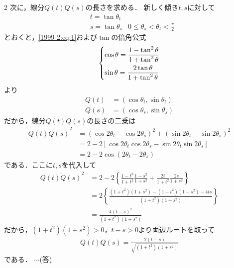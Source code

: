 \documentclass[../../../../main.tex]{subfiles}
\begin{document}
\begin{multicols}{2}
  次に，線分$Q(t)Q(s)$の長さを求める．
  新しく傾き$t,s$に対して
  \begin{align*}
     & t = \tan \theta_{t} &                                               \\
     & s = \tan \theta_{s} & 0 \le \theta_{s} < \theta_{t} < \frac{\pi}{2}
  \end{align*}
  とおくと，\cref{1999-2:eq:1}および$\tan$の倍角公式
  \begin{align}
    \begin{dcases}
      \cos \theta = \frac{1-\tan^2\theta}{1+\tan^2\theta} \\
      \sin \theta = \frac{2\tan\theta}{1+\tan^2\theta}
    \end{dcases} \label{1999-2:eq:3}
  \end{align}
  より
  \begin{align*}
    Q(t) & = \left(\cos\theta_{t},\sin\theta_{t}\right) \\
    Q(s) & = \left(\cos\theta_{s},\sin\theta_{s}\right)
  \end{align*}
  だから，線分$Q(t)Q(s)$の長さの二乗は
  \begin{align}
    \overline{Q(t)Q(s)}^2
     & = (\cos 2\theta_{t} - \cos 2\theta_{s})^2 + (\sin 2\theta_{t} - \sin 2\theta_{s})^2        \\
     & = 2 - 2 \left[\cos 2\theta_{t} \cos 2\theta_{s} - \sin 2\theta_{t} \sin 2\theta_{s}\right] \\
     & = 2 - 2 \cos (2\theta_{t} - 2\theta_{s}) \label{1999-2:eq:2}
  \end{align}
  である．ここに$t,s$を代入して
  \begin{align*}
    \overline{Q(t)Q(s)}^2
     & = 2 - 2 \left\{ \frac{1-t^2}{1+t^2} \frac{1-s^2}{1+s^2} + \frac{2t}{1+t^2} \frac{2s}{1+s^2} \right\} \\
     & = 2 \left\{ \frac{(1+t^2)(1+s^2)-(1-t^2)(1-s^2)-4ts}{(1+t^2)(1+s^2)} \right\}                        \\
     & = \frac{4(t-s)^2}{(1+t^2)(1+s^2)}
  \end{align*}
  だから，$(1+t^2)(1+s^2)>0$，$t-s>0$より両辺ルートを取って
  \begin{align*}
    \overline{Q(t)Q(s)} = \frac{2(t-s)}{\sqrt{(1+t^2)(1+s^2)}}
  \end{align*}
  である．  $\cdots$(答)
  \vspace{10pt}


\end{multicols}
\end{document}
